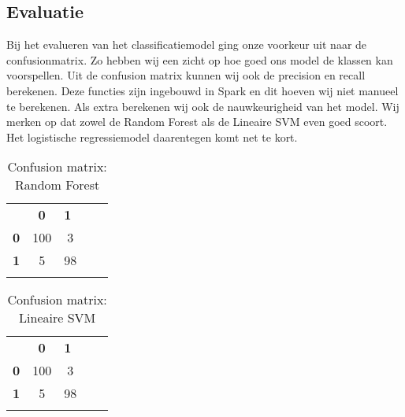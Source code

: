 \documentclass[a4paper,10pt,twoside]{report}
\begin{document}
\subsection*{Evaluatie}

Bij het evalueren van het classificatiemodel ging onze voorkeur uit naar de confusionmatrix. Zo hebben wij een zicht op hoe goed ons model de klassen kan voorspellen. Uit de confusion matrix kunnen wij ook de precision en recall berekenen. Deze functies zijn ingebouwd in Spark en dit hoeven wij niet manueel te berekenen. Als extra berekenen wij ook de nauwkeurigheid van het model. Wij merken op dat zowel de Random Forest als de Lineaire SVM even goed scoort. Het logistische regressiemodel daarentegen komt net te kort.

\begin{table}[]
    \caption{Confusion matrix: Random Forest}
    \label{tab:my-table}
    \begin{tabular}{lclll}
    \multicolumn{1}{c}{\textbf{}}   & \textbf{0}               & \textbf{1}              &  &  \\ \cline{2-3}
    \multicolumn{1}{c|}{\textbf{0}} & \multicolumn{1}{c|}{100} & \multicolumn{1}{c|}{3}  &  &  \\ \cline{2-3}
    \multicolumn{1}{l|}{\textbf{1}} & \multicolumn{1}{c|}{5}   & \multicolumn{1}{c|}{98} &  &  \\ \cline{2-3}
                                    & \multicolumn{1}{l}{}     &                         &  & 
    \end{tabular}
\end{table}

\begin{table}[]
    \caption{Confusion matrix: Lineaire SVM}
    \label{tab:my-table}
    \begin{tabular}{lclll}
    \multicolumn{1}{c}{\textbf{}}   & \textbf{0}               & \textbf{1}              &  &  \\ \cline{2-3}
    \multicolumn{1}{c|}{\textbf{0}} & \multicolumn{1}{c|}{100} & \multicolumn{1}{c|}{3}  &  &  \\ \cline{2-3}
    \multicolumn{1}{l|}{\textbf{1}} & \multicolumn{1}{c|}{5}   & \multicolumn{1}{c|}{98} &  &  \\ \cline{2-3}
                                    & \multicolumn{1}{l}{}     &                         &  & 
    \end{tabular}
\end{table}
\end{document}
